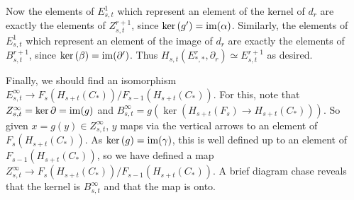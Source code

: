 \documentclass[11pt]{article}
\begin{document}
Now the elements of $E^1_{s,t}$ which represent an element of the kernel of $d_r$ are exactly the elements of $Z^{r+1}_{s,t}$, since $\textup{ker}\,(g')=\operatorname{im}(\alpha)$. Similarly, the elements of $E^1_{s,t}$ which represent an element of the image of $d_r$ are exactly the elements of $B^{r+1}_{s,t}$, since $\textup{ker}\,(\beta)=\operatorname{im}(\partial')$. Thus $H_{s,t}(E^r_{*,*},\partial_r)\simeq E^{r+1}_{s,t}$ as desired.

Finally, we should find an isomorphism $E^\infty_{s,t}\to F_s(H_{s+t}(C_*))/F_{s-1}(H_{s+t}(C_*))$. For this, note that $Z^\infty_{s,t}=\textup{ker}\,\partial=\operatorname{im}(g)$ and $B^\infty_{s,t}=g(\ker(H_{s+t}(F_s)\to H_{s+t}(C_*)))$. So given $x=g(y)\in Z^\infty_{s,t}$, $y$ maps via the vertical arrows to an element of $F_s(H_{s+t}(C_*))$. As $\textup{ker}\,(g)=\operatorname{im}(\gamma)$, this is well defined up to an element of $F_{s-1}(H_{s+t}(C_*))$, so we have defined a map $Z^\infty_{s,t}\to F_s(H_{s+t}(C_*))/F_{s-1}(H_{s+t}(C_*))$. A brief diagram chase reveals that the kernel is $B^\infty_{s,t}$ and that the map is onto.
%
\end{document}
